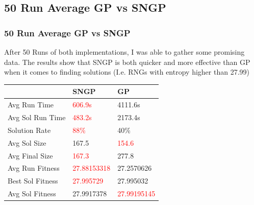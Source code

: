 \documentclass{beamer}
\begin{document}
\subsection{50 Run Average GP vs SNGP}
\begin{frame}
\frametitle{50 Run Average GP vs SNGP}
After 50 Runs of both implementations, I was able to gather some promising data. The results show that SNGP is both quicker and more effective than GP when it comes to finding solutions (I.e. RNGs with entropy higher than 27.99)

\begin{table}
    \begin{tabular}{l|l|l}
    ~                 & SNGP           & GP             \\ \hline
    Avg Run Time      &    \textcolor{red}{606.9s} &    4111.6s \\
    Avg Sol Run Time  & \textcolor{red}{483.2s}    & 2173.4s   \\
    Solution Rate     & \textcolor{red}{88\%}           & 40\%           \\
    Avg Sol Size      & 167.5  & \textcolor{red}{154.6}          \\
    Avg Final Size    & \textcolor{red}{167.3}        & 277.8          \\
    Avg Run Fitness   & \textcolor{red}{27.88153318}    &  27.2570626    \\
    Best Sol Fitness  & \textcolor{red}{27.995729}      & 27.995032      \\
    Avg Sol Fitness   & 27.9917378     & \textcolor{red}{27.99195145}    \\
    \end{tabular}
\end{table}

\end{frame}
\end{document}
